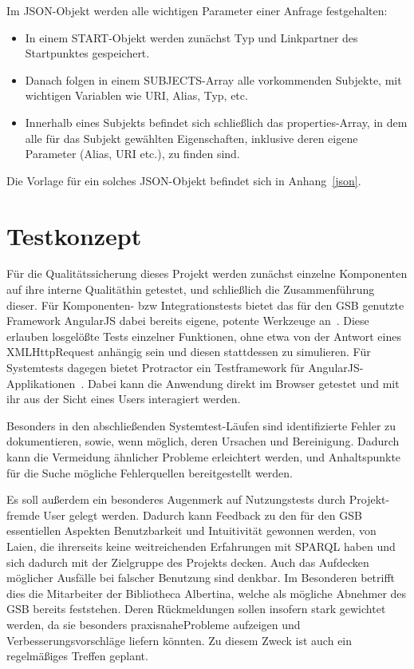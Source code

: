 Im JSON-Objekt werden alle wichtigen Parameter einer Anfrage
festgehalten:
\begin{itemize}
\item In einem START-Objekt werden zunächst Typ und Linkpartner des
Startpunktes gespeichert. 
\item Danach folgen in einem SUBJECTS-Array alle vorkommenden
  Subjekte, mit wichtigen Variablen wie URI, Alias, Typ, etc. 
\item Innerhalb eines Subjekts befindet sich schließlich das properties-Array, in dem alle für das Subjekt gewählten Eigenschaften, inklusive deren eigene Parameter (Alias, URI etc.), zu finden sind.
\end{itemize}

Die Vorlage für ein solches JSON-Objekt befindet sich in Anhang~\ref{json}.

\section{Testkonzept}

Für die Qualitätssicherung dieses Projekt werden zunächst einzelne
Komponenten auf ihre \glqq interne Qualität\glqq hin getestet, und schließlich
die Zusammenführung dieser. Für Komponenten- bzw Integrationstests
bietet das für den GSB genutzte Framework AngularJS dabei bereits
eigene, potente Werkzeuge an~\cite{ajsut}. Diese erlauben losgelößte Tests
einzelner Funktionen, ohne etwa von der Antwort eines XMLHttpRequest
anhängig sein und diesen stattdessen zu simulieren. Für Systemtests
dagegen bietet Protractor ein Testframework für
AngularJS-Applikationen~\cite{prot}. Dabei kann die Anwendung direkt im
Browser getestet und mit ihr aus der Sicht eines Users interagiert
werden.

Besonders in den abschließenden Systemtest-Läufen sind identifizierte
Fehler zu dokumentieren, sowie, wenn möglich, deren Ursachen und
Bereinigung. Dadurch kann die Vermeidung ähnlicher Probleme
erleichtert werden, und Anhaltspunkte für die Suche mögliche
Fehlerquellen bereitgestellt werden.

Es soll außerdem ein besonderes Augenmerk auf Nutzungstests durch
Projekt-fremde User gelegt werden. Dadurch kann Feedback zu den für
den GSB essentiellen Aspekten Benutzbarkeit und Intuitivität gewonnen
werden, von Laien, die ihrerseits keine weitreichenden Erfahrungen mit
SPARQL haben und sich dadurch mit der Zielgruppe des Projekts
decken. Auch das Aufdecken möglicher Ausfälle bei falscher Benutzung
sind denkbar.
Im Besonderen betrifft dies die Mitarbeiter der Bibliotheca Albertina,
welche als mögliche Abnehmer des GSB bereits feststehen. Deren
Rückmeldungen sollen insofern stark gewichtet werden, da sie besonders
\glqq praxisnahe\glqq Probleme aufzeigen und Verbesserungsvorschläge liefern
könnten. Zu diesem Zweck ist auch ein regelmäßiges Treffen geplant.





